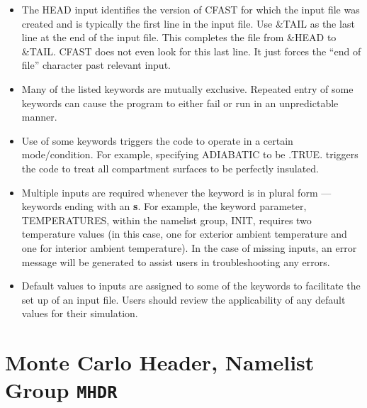 \begin{itemize}
\item The {\ct HEAD} input identifies the version of CFAST for which the input file was created and is typically the first line in the input file. Use {\ct \&TAIL} as the last line at the end of the input file. This completes the file from {\ct \&HEAD} to {\ct \&TAIL}. CFAST does not even look for this last line. It just forces the “end of file” character past relevant input.
\item Many of the listed keywords are mutually exclusive. Repeated entry of some keywords can cause the program to either fail or run in an unpredictable manner.
\item Use of some keywords triggers the code to operate in a certain mode/condition. For example, specifying {\ct ADIABATIC} to be {\ct .TRUE.} triggers the code to treat all compartment surfaces to be perfectly insulated.
\item Multiple inputs are required whenever the keyword is in plural form --- keywords ending with an \textbf{s}. For example, the keyword parameter, {\ct TEMPERATURES}, within the namelist group, {\ct INIT}, requires two temperature values (in this case, one for exterior ambient temperature and one for interior ambient temperature). In the case of missing inputs, an error message will be generated to assist users in troubleshooting any errors.
\item Default values to inputs are assigned to some of the keywords to facilitate the set up of an input file. Users should review the applicability of any default values for their simulation.
\end{itemize}


\clearpage

\section{Monte Carlo Header, Namelist Group \texorpdfstring{{\tt MHDR}}{MHDR}}

